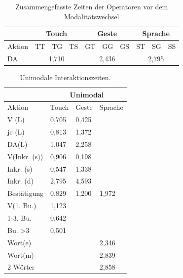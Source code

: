 \begin{table}[ht]
  \centering
	\begin{tabular}{|l|l|l|l|l|l|l|l|l|l|}
		\hline
		& \multicolumn{3}{|c|}{Touch} & \multicolumn{3}{|c|}{Geste}&\multicolumn{3}{|c|}{Sprache}\\
		\hline
		Aktion 					& TT 		& TG 		& TS 		& GT 		& GG 		& GS 		& ST 		& SG 		& SS\\
		\hline
		DA 	& \multicolumn{3}{|c|}{1,710} &	\multicolumn{3}{|c|}{2,436} 	&	\multicolumn{3}{|c|}{2,795} \\
		\hline
  \end{tabular}
	\caption{Zusammengefasste Zeiten der Operatoren vor dem Modalitätswechsel}
\label{tab:DA}
\end{table}
\begin{table}[ht]
  \centering
			\begin{tabular}{|l|l|l|l|}
					\hline
				& \multicolumn{3}{|c|}{Unimodal}\\
				\hline
				Aktion 					& Touch & Geste & Sprache \\
				\hline
				V (L) 		& {0,705} 	&	{0,425}	&	\\
				\hline
				je (L)				& {0,813} &	{1,372} &\\
				\hline
				DA(L)						& {1,047} &	{2,258} & \\
				\hline
				V(Inkr. (s))		& {0,906} &	{0,198} &\\
				\hline
				Inkr. (s)			& {0,547} &	{1,338} &\\
				\hline
				Inkr. (d)					& {2,795} &	4,593 & \\
				\hline
				Bestätigung 		& {0,829} &{1,200} & {1,972}\\
				\hline
				V(1. Bu.)					& {1,123} 	& 	&\\
				\hline
				1-3. Bu.					& {0,642} & 	& \\
				\hline
				Bu. >3 					& {0,501}		&  	& \\
				\hline
				Wort(e)					& & & {2,346} \\
				\hline
				Wort(m) 				& & & {2,839}\\
				\hline
				2 Wörter 				& & & {2,858}\\
				\hline
			\end{tabular}
	\caption{Unimodale Interaktionszeiten.}
	\label{tab:AktionenUnimodal}
\end{table}

